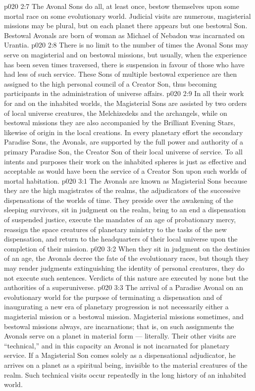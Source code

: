 \vs p020 2:7 \bibnobreakspace {} The Avonal Sons do all, at least once, bestow themselves upon some mortal race on some evolutionary world. Judicial visits are numerous, magisterial missions may be plural, but on each planet there appears but one bestowal Son. Bestowal Avonals are born of woman as Michael of Nebadon was incarnated on Urantia.
\vs p020 2:8 \pc There is no limit to the number of times the Avonal Sons may serve on magisterial and on bestowal missions, but usually, when the experience has been seven times traversed, there is suspension in favour of those who have had less of such service. These Sons of multiple bestowal experience are then assigned to the high personal council of a Creator Son, thus becoming participants in the administration of universe affairs.
\vs p020 2:9 In all their work for and on the inhabited worlds, the Magisterial Sons are assisted by two orders of local universe creatures, the Melchizedeks and the archangels, while on bestowal missions they are also accompanied by the Brilliant Evening Stars, likewise of origin in the local creations. In every planetary effort the secondary Paradise Sons, the Avonals, are supported by the full power and authority of a primary Paradise Son, the Creator Son of their local universe of service. To all intents and purposes their work on the inhabited spheres is just as effective and acceptable as would have been the service of a Creator Son upon such worlds of mortal habitation.
\vs p020 3:1 The Avonals are known as Magisterial Sons because they are the high magistrates of the realms, the adjudicators of the successive dispensations of the worlds of time. They preside over the awakening of the sleeping survivors, sit in judgment on the realm, bring to an end a dispensation of suspended justice, execute the mandates of an age of probationary mercy, reassign the space creatures of planetary ministry to the tasks of the new dispensation, and return to the headquarters of their local universe upon the completion of their mission.
\vs p020 3:2 When they sit in judgment on the destinies of an age, the Avonals decree the fate of the evolutionary races, but though they may render judgments extinguishing the identity of personal creatures, they do not execute such sentences. Verdicts of this nature are executed by none but the authorities of a superuniverse.
\vs p020 3:3 The arrival of a Paradise Avonal on an evolutionary world for the purpose of terminating a dispensation and of inaugurating a new era of planetary progression is not necessarily either a magisterial mission or a bestowal mission. Magisterial missions sometimes, and bestowal missions always, are incarnations; that is, on such assignments the Avonals serve on a planet in material form --- literally. Their other visits are “technical,” and in this capacity an Avonal is not incarnated for planetary service. If a Magisterial Son comes solely as a dispensational adjudicator, he arrives on a planet as a spiritual being, invisible to the material creatures of the realm. Such technical visits occur repeatedly in the long history of an inhabited world.
